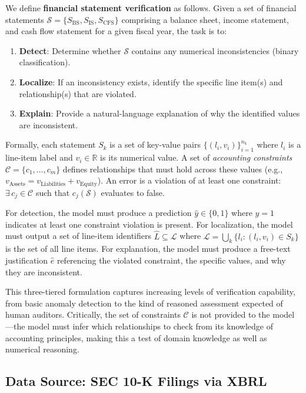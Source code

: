 \documentclass[11pt]{article}
\begin{document}
We define \textbf{financial statement verification} as follows.
Given a set of financial statements $\mathcal{S} = \{S_{\text{BS}}, S_{\text{IS}}, S_{\text{CFS}}\}$ comprising a balance sheet, income statement, and cash flow statement for a given fiscal year, the task is to:

\begin{enumerate}[topsep=2pt,itemsep=1pt]
    \item \textbf{Detect}: Determine whether $\mathcal{S}$ contains any numerical inconsistencies (binary classification).
    \item \textbf{Localize}: If an inconsistency exists, identify the specific line item(s) and relationship(s) that are violated.
    \item \textbf{Explain}: Provide a natural-language explanation of why the identified values are inconsistent.
\end{enumerate}

Formally, each statement $S_k$ is a set of key-value pairs $\{(l_i, v_i)\}_{i=1}^{n_k}$ where $l_i$ is a line-item label and $v_i \in \mathbb{R}$ is its numerical value.
A set of \emph{accounting constraints} $\mathcal{C} = \{c_1, \ldots, c_m\}$ defines relationships that must hold across these values (e.g., $v_{\text{Assets}} = v_{\text{Liabilities}} + v_{\text{Equity}}$).
An error is a violation of at least one constraint: $\exists\, c_j \in \mathcal{C}$ such that $c_j(\mathcal{S})$ evaluates to false.

For detection, the model must produce a prediction $\hat{y} \in \{0, 1\}$ where $y = 1$ indicates at least one constraint violation is present.
For localization, the model must output a set of line-item identifiers $\hat{L} \subseteq \mathcal{L}$ where $\mathcal{L} = \bigcup_k \{l_i : (l_i, v_i) \in S_k\}$ is the set of all line items.
For explanation, the model must produce a free-text justification $\hat{e}$ referencing the violated constraint, the specific values, and why they are inconsistent.

This three-tiered formulation captures increasing levels of verification capability, from basic anomaly detection to the kind of reasoned assessment expected of human auditors.
Critically, the set of constraints $\mathcal{C}$ is not provided to the model---the model must infer which relationships to check from its knowledge of accounting principles, making this a test of domain knowledge as well as numerical reasoning.

\subsection{Data Source: SEC 10-K Filings via XBRL}
\label{sec:data}
\end{document}
